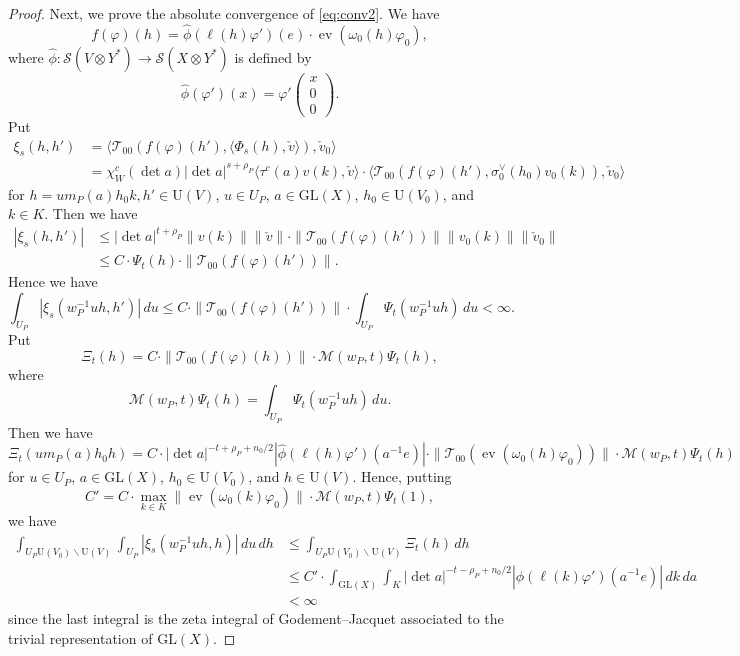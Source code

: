 \documentclass[11pt]{amsart}
\numberwithin{equation}{section}
\theoremstyle{plain}
\theoremstyle{definition}
\theoremstyle{remark}
\def\ev{\operatorname{ev}}
\def\GL{\mathrm{GL}}
\def\U{\mathrm{U}}
\def\M{\mathcal{M}}
\def\T{\mathcal{T}}
\def\s{\mathscr{S}}
\begin{document}
\begin{proof}
Next, we prove the absolute convergence of \eqref{eq:conv2}.
We have
\[
 f(\varphi)(h) = \hat{\phi}(\ell(h) \varphi')(e) \cdot \ev(\omega_0(h) \varphi_0),
\]
where $\hat{\phi}:\s(V \otimes Y^*) \rightarrow \s(X \otimes Y^*)$ is defined by
\[
 \hat{\phi}(\varphi')(x) = \varphi'
 \begin{pmatrix}
  x \\
  0 \\
  0
 \end{pmatrix}.
\]
Put
\begin{align*}
 \xi_s(h,h')
 & = \langle \T_{00} (f(\varphi)(h'), \langle \Phi_s(h), \check{v} \rangle ), \check{v}_0 \rangle \\
 & = \chi_W^c(\det a) |\det a|^{s+\rho_P} \langle \tau^c(a) v(k), \check{v} \rangle
 \cdot \langle \T_{00}(f(\varphi)(h'), \sigma_0^\vee(h_0) v_0(k)), \check{v}_0 \rangle
\end{align*}
for $h = u m_P(a) h_0 k, h' \in \U(V)$, $u \in U_P$, $a \in \GL(X)$, $h_0 \in \U(V_0)$, and $k \in K$.
Then we have
\begin{align*}
 |\xi_s(h,h')|
 & \le |\det a|^{t+\rho_P}  \| v(k) \| \| \check{v} \|
 \cdot \| \T_{00}(f(\varphi)(h')) \| \| v_0(k) \| \| \check{v}_0 \| \\
 & \le C \cdot \Psi_t(h) \cdot \| \T_{00}(f(\varphi)(h')) \|.
\end{align*}
Hence we have
\[
 \int_{U_P} |\xi_s(w_P^{-1} u h, h')| \, du
 \le C \cdot \| \T_{00}(f(\varphi)(h')) \| \cdot \int_{U_P} \Psi_t(w_P^{-1} u h) \, du < \infty.
\]
Put
\[
 \Xi_t(h) = C \cdot \| \T_{00}(f(\varphi)(h)) \| \cdot \M(w_P,t) \Psi_t(h),
\]
where 
\[
 \M(w_P,t) \Psi_t(h) =  \int_{U_P} \Psi_t(w_P^{-1} u h) \, du.
\]
Then we have
\[
 \Xi_t(u m_P(a) h_0h) = C \cdot |\det a|^{-t+\rho_P+n_0/2} |\hat{\phi}(\ell(h) \varphi')(a^{-1} e)| \cdot \| \T_{00}(\ev(\omega_0(h) \varphi_0))\| \cdot \M(w_P,t) \Psi_t(h) 
\]
for $u \in U_P$, $a \in \GL(X)$, $h_0 \in \U(V_0)$, and $h \in \U(V)$.
Hence, putting 
\[
 C' = C \cdot \max_{k \in K} \| \ev(\omega_0(k) \varphi_0)\|
 \cdot \M(w_P,t) \Psi_t(1),
\]
we have
\begin{align*}
 \int_{U_P \U(V_0) \backslash \U(V)} \int_{U_P} |\xi_s(w_P^{-1} u h, h)| \, du  \, dh
 & \le \int_{U_P \U(V_0) \backslash \U(V)} \Xi_t(h) \, dh \\
 & \le C' \cdot \int_{\GL(X)} \int_K
 |\det a|^{-t-\rho_P + n_0/2}
 |\hat{\phi}(\ell(k) \varphi')(a^{-1} e)| \, dk \, da \\
 & < \infty
\end{align*}
since the last integral is the zeta integral of Godement--Jacquet associated to the trivial representation of $\GL(X)$.
\end{proof}
\end{document}
